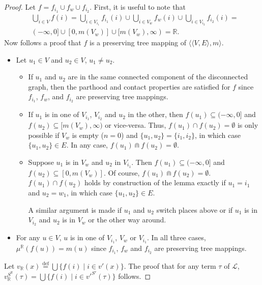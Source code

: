 \documentclass{article}
\newcommand{\R}{\mathbb{R}}
\newcommand{\bcap}{\Cap}
\newcommand{\lang}{\mathcal{L}}
\newcommand{\eqdef}{\stackrel{\text{def}}{=}}
\begin{document}
\begin{proof}
    Let $f = f_{i_1} \cup f_w \cup f_{i_2}$. First, it is useful to note that
    \begin{align*}
      & \bigcup_{i \in V}f(i) = \bigcup_{i \in V_{i_1}}f_{i_1}(i) \cup \bigcup_{i \in V_w}f_w(i) \cup \bigcup_{i \in V_{i_2}}f_{i_2}(i) = \\
      & (-\infty, 0] \cup [0, m(V_w)] \cup [m(V_w), \infty) = \R.
    \end{align*}
    Now follows a proof that $f$ is a preserving tree mapping of $\langle \langle V, E \rangle, m \rangle$.
    \begin{itemize}
    \item Let $u_1 \in V$ and $u_2 \in V$, $u_1 \neq u_2$.
      \begin{itemize}
      \item If $u_1$ and $u_2$ are in the same connected component of the disconnected graph, then the parthood and contact properties are satisfied for $f$ since $f_{i_1}$, $f_w$, and $f_{i_2}$ are preserving tree mappings.
      \item If $u_1$ is in one of $V_{i_1}$, $V_{i_2}$ and $u_2$ in the other, then $f(u_1) \subseteq (-\infty, 0]$ and $f(u_2) \subseteq [m(V_w), \infty)$ or vice-versa.
    Thus, $f(u_1) \cap f(u_2) = \emptyset$ is only possible if $V_w$ is empty ($n = 0$) and $\{u_1, u_2\} = \{i_1, i_2\}$, in which case $\{u_1, u_2\} \in E$. In any case, $f(u_1) \bcap f(u_2) = \emptyset$.
  \item Suppose $u_1$ is in $V_w$ and $u_2$ in $V_{i_1}$. Then $f(u_1) \subseteq (-\infty, 0]$ and $f(u_2) \subseteq [0, m(V_w)]$. Of course, $f(u_1) \bcap f(u_2) = \emptyset$. $f(u_1) \cap f(u_2)$ holds by construction of the lemma exactly if $u_1 = i_1$ and $u_2 = w_1$, in  which case $\{u_1, u_2\} \in E$.

    A similar argument is made if $u_1$ and $u_2$ switch places above or if $u_1$ is in $V_{i_2}$ and $u_2$ is in $V_w$ or the other way around.
      \end{itemize}
    \item For any $u \in V$, $u$ is in one of $V_{i_1}$, $V_w$ or $V_{i_1}$. In all three cases, $\mu^\R(f(u)) = m(u)$ since $f_{i_1}$, $f_w$ and $f_{i_2}$ are preserving tree mappings.
    \end{itemize}

    Let $v_\R(x) \eqdef \bigcup\{ f(i) \mid i \in v'(x) \}$. The proof that for any term $\tau$ of $\lang$, $v_\R^{S^\R}(\tau) = \bigcup\{ f(i) \mid i \in v'^{S'}(\tau)\}$ follows.


\end{proof}
\end{document}
